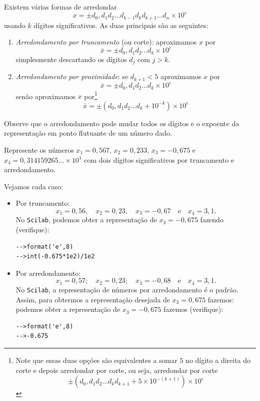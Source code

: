\documentclass[main.tex]{subfiles}
\begin{document}
Existem várias formas de arredondar 
\begin{equation*}
  x = \pm d_0,d_1d_2\ldots d_{k-1}d_kd_{k+1}\ldots d_n \times 10^e
\end{equation*}
usando $k$ dígitos significativos. As duas principais são as seguintes:
\begin{enumerate}
\item \emph{Arredondamento por truncamento} (ou corte): aproximamos $x$ por
$$
  \bar{x} = \pm d_{0},d_{1}d_{2}\ldots d_{k}\times 10^e
$$
simplesmente descartando os dígitos $d_{j}$ com $j > k$.
\item \emph{Arredondamento por proximidade}: se $d_{k+1}<5$ aproximamos $x$ por
$$
  \bar{x} = \pm d_0,d_1d_2\ldots d_{k}\times 10^{e}
$$
senão aproximamos $x$ por\footnote{Note que essas duas opções são equivalentes a somar $5$ no dígito a direita do corte e depois arredondar por corte, ou seja, arredondar por corte 
$$ \pm(d_0,d_1d_2\ldots d_kd_{k+1}+ 5 \times10^{-(k+1)} )\times 10^{e} $$}
$$
 \bar{x} = \pm(d_0,d_1d_2\ldots d_{k} + 10^{-k}) \times 10^{e}
$$
\end{enumerate}
\begin{obs}
  Observe que o arredondamento pode mudar todos os dígitos e o expoente da representação em ponto flutuante de um número dado.
\end{obs}


\begin{ex} Represente os números $x_1 = 0,567$, $x_2 = 0,233$, $x_3 = -0,675$ e $x_4 = 0,314159265 \ldots \times 10^1$ com dois dígitos significativos por truncamento e arredondamento.
\end{ex}
\begin{sol} Vejamos cada caso:
  \begin{itemize}
  \item Por truncamento:
    \begin{equation*}
      x_1=0,56,\quad x_2=0,23,\quad x_3=-0,67\quad\mbox{e}\quad x_4 = 3,1.
    \end{equation*}
\ifisscilab
No \verb+Scilab+, podemos obter a representação de $x_3 = -0,675$ fazendo (verifique):
\begin{verbatim}
-->format('e',8)
-->int(-0.675*1e2)/1e2
\end{verbatim}
\fi
  \item Por arredondamento:
    \begin{equation*}
      x_1=0,57;\quad x_2=0,23;\quad x_3=-0,68\quad\mbox{e}\quad x_4 = 3,1.  
    \end{equation*}
\ifisscilab
No \verb+Scilab+, a representação de números por arredondamento é o padrão. Assim, para obtermos a representação desejada de $x_3 = 0,675$ fazemos: podemos obter a representação de $x_3 = -0,675$ fazemos (verifique):
\begin{verbatim}
-->format('e',8)
-->-0.675
\end{verbatim}
\fi
  \end{itemize}
\end{sol}
\end{document}
